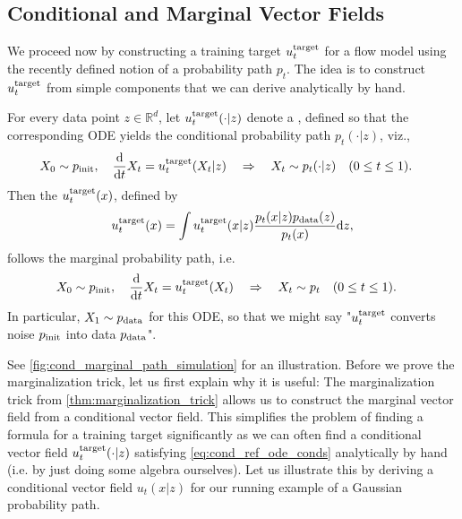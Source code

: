 \subsection{Conditional and Marginal Vector Fields}
We proceed now by constructing a training target $u^{\text{target}}_t$ for a flow model using the recently defined notion of a probability path $p_t$. The idea is to construct $u^{\text{target}}_t$ from simple components that we can derive analytically by hand.
\begin{theorem}
\label{thm:marginalization_trick}
For every data point $z\in \mathbb{R}^d$, let $u^{\text{target}}_t(\cdot|z)$ denote a , defined so that the corresponding ODE yields the conditional probability path $p_t(\cdot|z)$, viz.,
\begin{align}
\label{eq:cond_ref_ode_conds}
    X_0&\sim p_{\rm{init}},\quad \frac{\mathrm{d}}{\mathrm{d} t}X_t =u^{\text{target}}_t(X_t|z)\quad \Rightarrow \quad X_t\sim p_t(\cdot|z)\quad (0\leq t\leq 1).
\end{align}
Then the  $u^{\text{target}}_t(x)$, defined by
\begin{align}
    \label{eq:marginal_vector_field}
    u^{\text{target}}_t(x) = \int u^{\text{target}}_t(x|z)\frac{p_t(x|z)p_{\rm{data}}(z)}{p_t(x)}\mathrm{d} z,
\end{align}
follows the marginal probability path, i.e. 
\begin{align}
\label{eq:marginal_ode_follows_marginal_path}
    X_0&\sim p_{\rm{init}},\quad \frac{\mathrm{d}}{\mathrm{d} t}X_t =u^{\text{target}}_t(X_t)\quad \Rightarrow \quad X_t\sim p_t\quad (0\leq t\leq 1).
\end{align}
In particular, $X_1\sim p_{\rm{data}}$ for this ODE, so that we might say "$u^{\text{target}}_t$ converts noise $p_{\rm{init}}$ into data $p_{\rm{data}}$".
\end{theorem}
See \cref{fig:cond_marginal_path_simulation} for an illustration. Before we prove the marginalization trick, let us first explain why it is useful: The marginalization trick from \cref{thm:marginalization_trick} allows us to construct the marginal vector field from a conditional vector field. This simplifies the problem of finding a formula for a training target significantly as we can often find a conditional vector field $u^{\text{target}}_t(\cdot|z)$ satisfying \cref{eq:cond_ref_ode_conds} analytically by hand (i.e. by just doing some algebra ourselves). Let us illustrate this by deriving a conditional vector field $u_t(x|z)$ for our running example of a Gaussian probability path.



